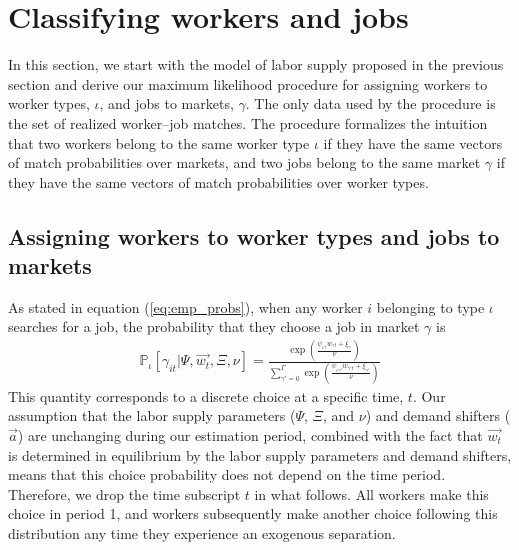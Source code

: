 \documentclass[12pt]{article}
\def\ig{\iota\gamma}
\def\g{\gamma}
\def\i{\iota}
\renewcommand{\P}{\mathbb {P}}
\theoremstyle{definition}
\theoremstyle{plain}
\begin{document}
\section{Classifying workers and jobs}


In this section, we start with the model of labor supply proposed in the previous section and derive our maximum likelihood procedure for assigning workers to worker types, $\i$, and jobs to markets, $\g$. The only data used by the procedure is the set of realized worker--job matches. The procedure formalizes the intuition that two workers belong to the same worker type $\i$ if they have the same vectors of match probabilities over markets, and two jobs belong to the same market $\g$ if they have the same vectors of match probabilities over worker types.


\label{sec:bisbm}

\subsection{Assigning workers to worker types and jobs to markets}


As stated in equation (\ref{eq:emp_probs}), when any worker $i$ belonging to type $\i$ searches for a job, the probability that they choose a job in market $\g$ is
\begin{align*}
\P_{\i}[\g_{it}|\Psi,\vec{w_t},\Xi,\nu]= \frac{\exp \left( \frac{\psi_{\ig} w_{\g t} + \xi_{\g}}{\nu} \right) }{ \sum\limits_{\g'=0}^{\Gamma} \exp \left( \frac{\psi_{\ig'} w_{\g' t} + \xi_{\g'}}{\nu} \right) }
\end{align*}
This quantity corresponds to a discrete choice at a specific time, $t$. Our assumption that the labor supply parameters ($\Psi$, $\Xi$, and $\nu$) and demand shifters ($\vec{a}$) are unchanging during our estimation period, combined with the fact that $\vec{w_t}$ is determined in equilibrium by the labor supply parameters and demand shifters, means that this choice probability does not depend on the time period. Therefore, we drop the time subscript $t$ in what follows. All workers make this choice in period 1, and workers subsequently make another choice following this distribution any time they experience an exogenous separation. 
\end{document}
